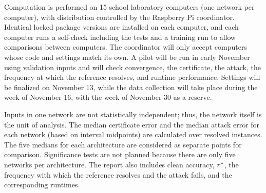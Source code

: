 Computation is performed on 15 school laboratory computers (one network per computer), with
distribution controlled by the Raspberry Pi coordinator. Identical locked package versions are
installed on each computer, and each computer runs a self-check including the
tests and a training run to allow comparisons between computers. The coordinator will only
accept computers whose code and settings match its own. A pilot
will be run in early November using validation inputs and will check convergence,
the certificate, the attack, the frequency at which the reference resolves, and
runtime performance. Settings will be finalized on November 13, while the data collection will take
place during the week of November 16, with the week of November 30 as a reserve.

Inputs in one network are not statistically independent; thus, the network itself is
the unit of analysis. The median certificate error and the median
attack error for each network (based on interval midpoints) are calculated
over resolved instances. The five medians for each architecture are considered as
separate points for comparison. Significance tests are not planned because there are only five
networks per architecture. The report also includes clean accuracy, $r^{*}$, the frequency with
which the reference resolves and the attack fails, and the corresponding runtimes.

